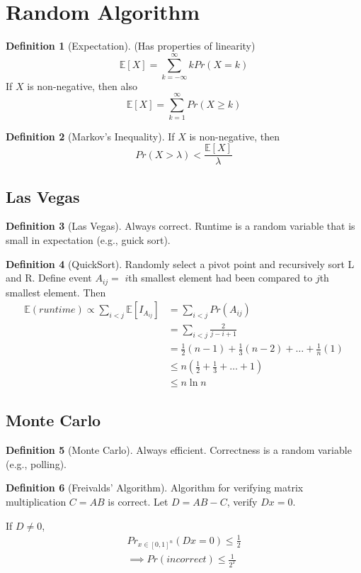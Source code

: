 \documentclass[11pt]{article}
\theoremstyle{definition}
\newtheorem{definition}{Definition}[section]
\theoremstyle{remark}
\begin{document}
\section{Random Algorithm}
\begin{definition}[Expectation] (Has properties of linearity)
\[
\mathbb{E}[X] = \sum_{k=-\infty}^\infty k Pr(X=k)
\]
If $X$ is non-negative, then also
\[
\mathbb{E}[X]=\sum_{k=1}^\infty Pr(X \geq k)
\]
\end{definition}

\begin{definition}[Markov's Inequality]
If $X$ is non-negative, then
\[
Pr(X>\lambda) < \frac{\mathbb{E}[X]}{\lambda}
\]
\end{definition}

\subsection{Las Vegas}
\begin{definition}[Las Vegas]
Always correct. Runtime is a random variable that is small in expectation (e.g., guick sort).
\end{definition}

\begin{definition}[QuickSort] Randomly select a pivot point and recursively sort L and R. Define event $A_{ij} = $ $i$th smallest element had been compared to $j$th smallest element. Then
\begin{align*}
\mathbb{E}(runtime) \propto \sum_{i<j} \mathbb{E}[I_{A_{ij}}] &= \sum_{i<j} Pr(A_{ij}) \\
&= \sum_{i<j} \frac{2}{j-i+1} \\
&= \frac{1}{2}(n-1) + \frac{1}{3}(n-2)+\dots+\frac{1}{n}(1) \\
&\leq n\left(\frac{1}{2}+\frac{1}{3}+\dots+1\right) \\
&\leq n\ln n
\end{align*}
\end{definition}

\subsection{Monte Carlo}
\begin{definition}[Monte Carlo]
Always efficient. Correctness is a random variable (e.g., polling).
\end{definition}

\begin{definition}[Freivalds' Algorithm]
Algorithm for verifying matrix multiplication $C=AB$ is correct. Let $D=AB-C$, verify $Dx=0$.


If $D\neq 0$,
\begin{align*}
{Pr}_{x\in [0,1]^n}(Dx=0)\leq \frac{1}{2} \\
\implies Pr(incorrect) \leq \frac{1}{2^T}
\end{align*}
\end{definition}
\end{document}
